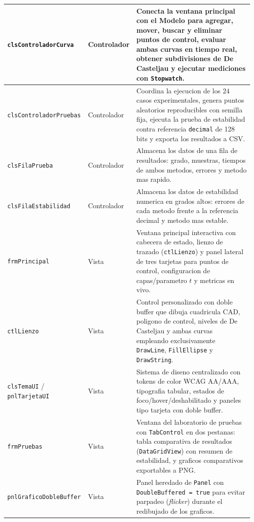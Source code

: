 \begin{table}[H]
\begin{tabular}{p{3.5cm} l p{8.5cm}}
\midrule
\texttt{clsControladorCurva} & Controlador & Conecta la ventana principal con el Modelo para agregar, mover, buscar y eliminar puntos de control, evaluar ambas curvas en tiempo real, obtener subdivisiones de De Casteljau y ejecutar mediciones con \texttt{Stopwatch}. \\
\midrule
\texttt{clsControladorPruebas} & Controlador & Coordina la ejecucion de los $24$ casos experimentales, genera puntos aleatorios reproducibles con semilla fija, ejecuta la prueba de estabilidad contra referencia \texttt{decimal} de 128 bits y exporta los resultados a CSV. \\
\midrule
\texttt{clsFilaPrueba} & Controlador & Almacena los datos de una fila de resultados: grado, muestras, tiempos de ambos metodos, errores y metodo mas rapido. \\
\midrule
\texttt{clsFilaEstabilidad} & Controlador & Almacena los datos de estabilidad numerica en grados altos: errores de cada metodo frente a la referencia decimal y metodo mas estable. \\
\midrule
\texttt{frmPrincipal} & Vista & Ventana principal interactiva con cabecera de estado, lienzo de trazado (\texttt{ctlLienzo}) y panel lateral de tres tarjetas para puntos de control, configuracion de capas/parametro $t$ y metricas en vivo. \\
\midrule
\texttt{ctlLienzo} & Vista & Control personalizado con doble buffer que dibuja cuadricula CAD, poligono de control, niveles de De Casteljau y ambas curvas empleando exclusivamente \texttt{DrawLine}, \texttt{FillEllipse} y \texttt{DrawString}. \\
\midrule
\texttt{clsTemaUI} / \texttt{pnlTarjetaUI} & Vista & Sistema de diseno centralizado con tokens de color WCAG AA/AAA, tipografia tabular, estados de foco/hover/deshabilitado y paneles tipo tarjeta con doble buffer. \\
\midrule
\texttt{frmPruebas} & Vista & Ventana del laboratorio de pruebas con \texttt{TabControl} en dos pestanas: tabla comparativa de resultados (\texttt{DataGridView}) con resumen de estabilidad, y graficos comparativos exportables a PNG. \\
\midrule
\texttt{pnlGraficoDobleBuffer} & Vista & Panel heredado de \texttt{Panel} con \texttt{DoubleBuffered = true} para evitar parpadeo (\textit{flicker}) durante el redibujado de los graficos. \\
\bottomrule
\end{tabular}
\end{table}

